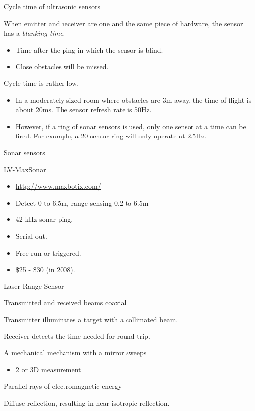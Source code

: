 \documentclass[compress]{beamer}
\providecommand{\tightlist}{%
  \setlength{\itemsep}{0pt}\setlength{\parskip}{0pt}}
\begin{document}
\begin{frame}{Cycle time of ultrasonic sensors}

When emitter and receiver are one and the same piece of hardware, the
sensor has a \emph{blanking time}.

\begin{itemize}
\tightlist
\item
  Time after the ping in which the sensor is blind.
\item
  Close obstacles will be missed.
\end{itemize}

Cycle time is rather low.

\begin{itemize}
\tightlist
\item
  In a moderately sized room where obstacles are 3m away, the time of
  flight is about 20ms. The sensor refresh rate is 50Hz.
\item
  However, if a ring of sonar sensors is used, only one sensor at a time
  can be fired. For example, a 20 sensor ring will only operate at
  2.5Hz.
\end{itemize}

\end{frame}

\begin{frame}{Sonar sensors}

LV-MaxSonar

\begin{itemize}
\tightlist
\item
  \url{http://www.maxbotix.com/}
\item
  Detect 0 to 6.5m, range sensing 0.2 to 6.5m
\item
  42 kHz sonar ping.
\item
  Serial out.
\item
  Free run or triggered.
\item
  \$25 - \$30 (in 2008).
\end{itemize}

\end{frame}

\begin{frame}{Laser Range Sensor}

Transmitted and received beams coaxial.

Transmitter illuminates a target with a collimated beam.

Receiver detects the time needed for round-trip.

A mechanical mechanism with a mirror sweeps

\begin{itemize}
\tightlist
\item
  2 or 3D measurement
\end{itemize}

Parallel rays of electromagnetic energy

Diffuse reflection, resulting in near isotropic reflection.

\end{frame}
\end{document}
